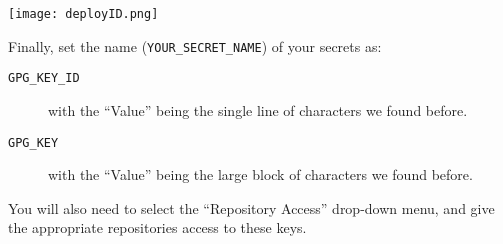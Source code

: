 \documentclass{ximera}
\begin{document}
\begin{image}
    \texttt{[image: deployID.png]}
\end{image}
        Finally, set the name (\verb!YOUR_SECRET_NAME!) of your secrets as:
        \begin{description}
            \item[\texttt{GPG\_KEY\_ID}] with the ``Value'' being the single
                line
                of characters we found before.
            \item[\texttt{GPG\_KEY}]  with the ``Value'' being the large block
                of
                characters we found before.
        \end{description}
        You will also need to select the ``Repository Access'' drop-down menu,
        and give
        the appropriate repositories access to these keys.
        \pdfOnly{\end{multicols}}%
\end{document}
